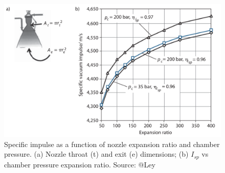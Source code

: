 \documentclass[
  ignorenonframetext,
]{beamer}
\begin{document}
\begin{frame}
\begin{figure}

{\centering \includegraphics{figs/fig4.5.png}

}

\caption{Specific impulse as a function of nozzle expansion ratio and
chamber pressure. (a) Nozzle throat (t) and exit (e) dimensions; (b)
\(I_{sp}\) vs chamber pressure expansion ratio. Source: @Ley}

\end{figure}
\end{frame}
\end{document}
